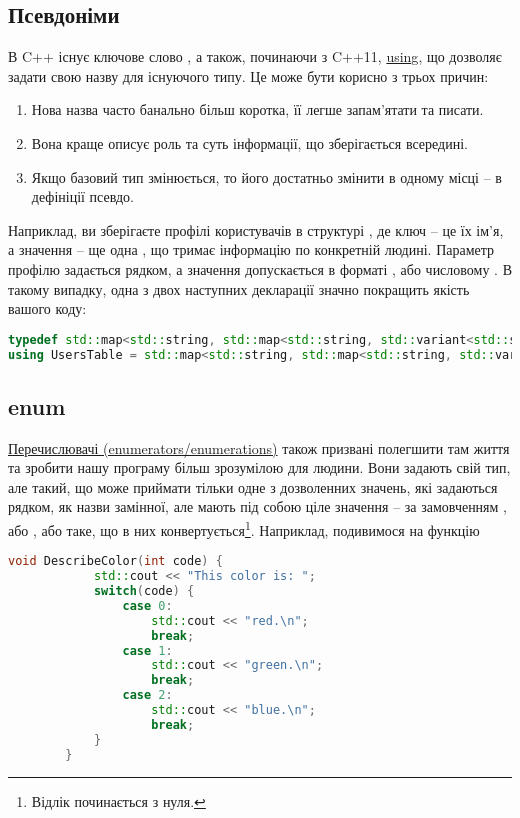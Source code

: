 \documentclass[12pt]{article}
\begin{document}
	\subsection{Псевдоніми}
	В C++ існує ключове слово \href{https://en.cppreference.com/w/cpp/language/typedef}{}, а також, починаючи з C++11, \href{https://en.cppreference.com/w/cpp/language/type_alias}{using}, що дозволяє задати свою назву для існуючого типу. Це може бути корисно з трьох причин:
	\begin{enumerate}
		\item Нова назва часто банально більш коротка, її легше запам'ятати та писати.
		\item Вона краще описує роль та суть інформації, що зберігається всередині.
		\item Якщо базовий тип змінюється, то його достатньо змінити в одному місці -- в дефініції псевдо.
	\end{enumerate}

	Наприклад, ви зберігаєте профілі користувачів в структурі , де ключ -- це їх ім'я, а значення -- ще одна , що тримає інформацію по конкретній людині. Параметр профілю задається рядком, а значення допускається в форматі , або числовому . В такому випадку, одна з двох наступних декларації значно покращить якість вашого коду:
	\begin{lstlisting}[language=c++]
typedef std::map<std::string, std::map<std::string, std::variant<std::string, int>>> UsersTable;
using UsersTable = std::map<std::string, std::map<std::string, std::variant<std::string, int>>>;
	\end{lstlisting}

	\subsection{enum}
	\href{https://en.cppreference.com/w/cpp/language/enum}{Перечислювачі (enumerators/enumerations)} також призвані полегшити там життя та зробити нашу програму більш зрозумілою для людини. Вони задають свій тип, але такий, що може приймати тільки одне з дозволенних значень, які задаються рядком, як назви замінної, але мають під собою ціле значення -- за замовченням , або , або таке, що в них конвертується\footnote{Відлік починається з нуля.}. Наприклад, подивимося на функцію
	\begin{lstlisting}[language=c++]
		void DescribeColor(int code) {
			std::cout << "This color is: ";
			switch(code) {
				case 0:
					std::cout << "red.\n";
					break;
				case 1:
					std::cout << "green.\n";
					break;
				case 2:
					std::cout << "blue.\n";
					break;
			}
		}
	\end{lstlisting}
\end{document}
